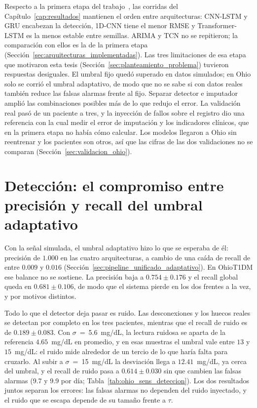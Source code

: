\documentclass{report}
\begin{document}
Respecto a la primera etapa del trabajo~\cite{sanchez2025imputation}, las corridas del Capítulo~\ref{cap:resultados} mantienen el orden entre arquitecturas: CNN-LSTM y GRU encabezan la detección, 1D-CNN tiene el menor RMSE y Transformer-LSTM es la menos estable entre semillas. ARIMA y TCN no se repitieron; la comparación con ellos es la de la primera etapa (Sección~\ref{sec:arquitecturas_implementadas}). Las tres limitaciones de esa etapa que motivaron esta tesis (Sección~\ref{sec:planteamiento_problema}) tuvieron respuestas desiguales. El umbral fijo quedó superado en datos simulados; en Ohio solo se corrió el umbral adaptativo, de modo que no se sabe si con datos reales también reduce las falsas alarmas frente al fijo. Separar detector e imputador amplió las combinaciones posibles más de lo que redujo el error. La validación real pasó de un paciente a tres, y la inyección de fallos sobre el registro dio una referencia con la cual medir el error de imputación y los indicadores clínicos, que en la primera etapa no había cómo calcular. Los modelos llegaron a Ohio sin reentrenar y los pacientes son otros, así que las cifras de las dos validaciones no se comparan (Sección~\ref{sec:validacion_ohio}).

\section{Detección: el compromiso entre precisión y recall del umbral adaptativo}
\label{sec:disc_deteccion}

Con la señal simulada, el umbral adaptativo hizo lo que se esperaba de él: precisión de $1.000$ en las cuatro arquitecturas, a cambio de una caída de recall de entre $0.009$ y $0.016$ (Sección~\ref{sec:pipeline_unificado_adaptativo}). En OhioT1DM ese balance no se sostiene. La precisión baja a $0.754 \pm 0.176$ y el recall global queda en $0.681 \pm 0.106$, de modo que el sistema pierde en los dos frentes a la vez, y por motivos distintos.

Todo lo que el detector deja pasar es ruido. Las desconexiones y los huecos reales se detectan por completo en los tres pacientes, mientras que el recall de ruido es de $0.189 \pm 0.083$. Con $\sigma$~=~5.6~mg/dL, la lectura ruidosa se aparta de la referencia $4.65$~mg/dL en promedio, y en esas muestras el umbral vale entre $13$ y $15$~mg/dL: el ruido mide alrededor de un tercio de lo que haría falta para cruzarlo. Al subir a $\sigma$~=~15~mg/dL la desviación llega a $12.41$~mg/dL, ya cerca del umbral, y el recall de ruido pasa a $0.614 \pm 0.030$ sin que cambien las falsas alarmas (9.7 y 9.9 por día; Tabla~\ref{tab:ohio_sens_deteccion}). Los dos resultados juntos separan los errores: las falsas alarmas no dependen del ruido inyectado, y el ruido que se escapa depende de su tamaño frente a $\tau$.
\end{document}
